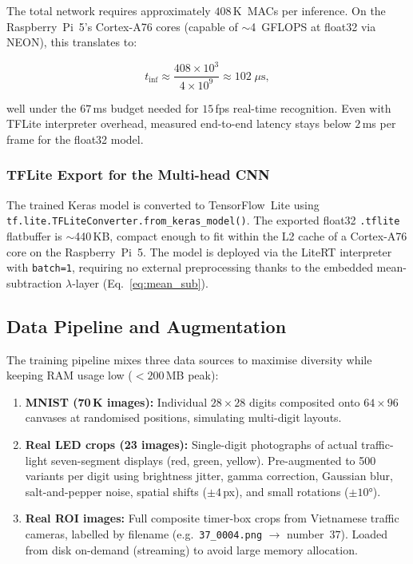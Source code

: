 The total network requires approximately $408$\,K~MACs per inference.
On the Raspberry~Pi~5's Cortex-A76 cores (capable of
$\sim$4~GFLOPS at float32 via NEON), this translates to:

\begin{equation}
\label{eq:latency}
  t_{\text{inf}}
  \approx \frac{408 \times 10^{3}}{4 \times 10^{9}}
  \approx 102 \;\mu\text{s},
\end{equation}

well under the $67$\,ms budget needed for $15$\,fps real-time recognition.
Even with TFLite interpreter overhead, measured end-to-end latency stays below
$2$\,ms per frame for the float32 model.

\subsubsection{TFLite Export for the Multi-head CNN}

The trained Keras model is converted to TensorFlow~Lite using
\texttt{tf.lite.TFLiteConverter.from\_keras\_model()}.  The exported
float32 \texttt{.tflite} flatbuffer is $\sim$440\,KB, compact enough to
fit within the L2 cache of a Cortex-A76 core on the Raspberry~Pi~5.
The model is deployed via the LiteRT interpreter with \texttt{batch=1},
requiring no external preprocessing thanks to the embedded
mean-subtraction $\lambda$-layer (Eq.~\eqref{eq:mean_sub}).

\subsection{Data Pipeline and Augmentation}
\label{sec:dataCNN}

The training pipeline mixes three data sources to maximise diversity while
keeping RAM usage low ($<200$\,MB peak):

\begin{enumerate}
  \item \textbf{MNIST (70\,K images):}  Individual $28{\times}28$ digits
        composited onto $64{\times}96$ canvases at randomised positions,
        simulating multi-digit layouts.
  \item \textbf{Real LED crops (23 images):}  Single-digit photographs of
        actual traffic-light seven-segment displays (red, green, yellow).
        Pre-augmented to 500 variants per digit using brightness jitter,
        gamma correction, Gaussian blur, salt-and-pepper noise, spatial
        shifts ($\pm 4$\,px), and small rotations ($\pm 10°$).
  \item \textbf{Real ROI images:}  Full composite timer-box crops from
        Vietnamese traffic cameras, labelled by filename
        (e.g.\ \texttt{37\_0004.png} $\to$ number~$37$).  Loaded from disk
        on-demand (streaming) to avoid large memory allocation.
\end{enumerate}


